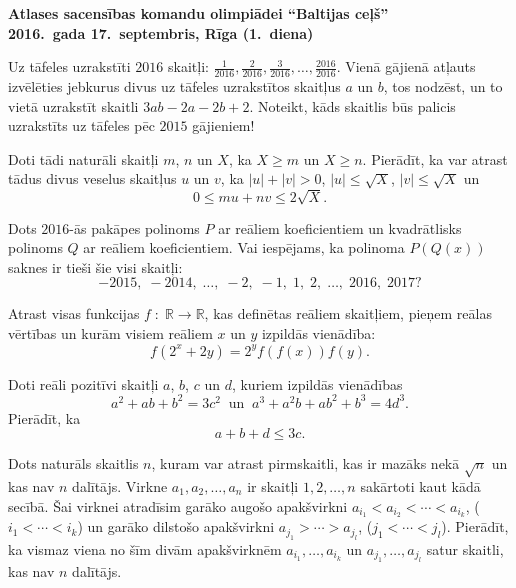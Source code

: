 \documentclass[11pt]{article}
\begin{document}
\begin{center}
{\Large \bf Atlases sacensības komandu olimpiādei ``Baltijas ceļš''}\\
{\bf 2016.\ gada 17.\ septembris, Rīga (1.\ diena)}
\end{center}


\begin{problem}[BwTst2016.1]
Uz tāfeles uzrakstīti $2016$ skaitļi: $\frac{1}{2016},\frac{2}{2016},\frac{3}{2016},\ldots,\frac{2016}{2016}$. 
Vienā gājienā atļauts izvēlēties jebkurus divus uz tāfeles uzrakstītos skaitļus $a$ un $b$, tos nodzēst, 
un to vietā uzrakstīt skaitli $3ab - 2a - 2b + 2$. Noteikt, 
kāds skaitlis būs palicis uzrakstīts uz tāfeles pēc $2015$ gājieniem!
\end{problem}

\begin{problem}[BwTst2016.2]
Doti tādi naturāli skaitļi $m$, $n$ un $X$, ka $X \geq m$ un $X \geq n$. Pierādīt, ka var atrast
tādus divus veselus skaitļus $u$ un $v$, ka $|u| + |v| > 0$, $|u| \leq \sqrt{X}$, $|v| \leq \sqrt{X}$ un 
\[ 0 \leq mu  + nv \leq 2\sqrt{X}. \]
\end{problem}

\begin{problem}[BwTst2016.3]
Dots $2016$-ās pakāpes polinoms $P$ ar reāliem koeficientiem un 
kvadrātlisks polinoms $Q$ ar reāliem koeficientiem. Vai iespējams, ka 
polinoma $P(Q(x))$ saknes ir tieši šie visi skaitļi:
\[ -2015,\;-2014,\;\ldots,\;-2,\;-1,\;1,\;2,\;\ldots,\;2016,\;2017? \]
\end{problem}

\begin{problem}[BwTst2016.4]
Atrast visas funkcijas $f\;:\;\mathbb{R} \rightarrow \mathbb{R}$, kas definētas 
reāliem skaitļiem, pieņem reālas vērtības un kurām visiem reāliem $x$ un $y$ izpildās 
vienādība: 
\[ f\left( 2^x + 2y \right)  = 2^y f(f(x))f(y). \]
\end{problem}


\begin{problem}[BwTst2016.5]
Doti reāli pozitīvi skaitļi $a$, $b$, $c$ un $d$, kuriem izpildās vienādības 
\[ a^2 + ab + b^2 = 3c^2 \;\; \mbox{un} \;\; a^3 + a^2b + ab^2 + b^3 = 4d^3. \]
Pierādīt, ka 
\[ a + b + d \leq 3c. \]
\end{problem}

\begin{problem}[BwTst2016.6]
Dots naturāls skaitlis $n$, kuram var atrast pirmskaitli, kas ir mazāks nekā 
$\sqrt{n}$ un kas nav $n$ dalītājs. Virkne 
$a_1,a_2,\ldots,a_n$ ir skaitļi $1,2,\ldots,n$ sakārtoti kaut kādā secībā. 
Šai virknei atradīsim garāko augošo apakšvirkni $a_{i_1} < a_{i_2} < \cdots < a_{i_k}$, 
($i_1 < \cdots < i_k$) un garāko dilstošo apakšvirkni 
$a_{j_1} > \cdots > a_{j_l}$, ($j_1 < \cdots < j_l$). 
Pierādīt, ka vismaz viena no šīm divām apakšvirknēm 
$a_{i_1},\ldots,a_{i_k}$ un $a_{j_1},\ldots,a_{j_l}$ satur skaitli, kas nav $n$ dalītājs.  
\end{problem}
\end{document}
